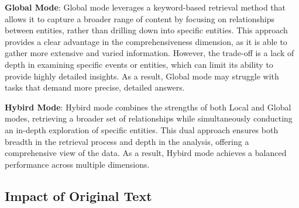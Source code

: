 \textbf{Global Mode}: Global mode leverages a keyword-based retrieval method that allows it to capture a broader range of content by focusing on relationships between entities, rather than drilling down into specific entities. This approach provides a clear advantage in the comprehensiveness dimension, as it is able to gather more extensive and varied information. However, the trade-off is a lack of depth in examining specific events or entities, which can limit its ability to provide highly detailed insights. As a result, Global mode may struggle with tasks that demand more precise, detailed answers.

\textbf{Hybird Mode}: Hybird mode combines the strengths of both Local and Global modes, retrieving a broader set of relationships while simultaneously conducting an in-depth exploration of specific entities. This dual approach ensures both breadth in the retrieval process and depth in the analysis, offering a comprehensive view of the data. As a result, Hybird mode achieves a balanced performance across multiple dimensions.

\subsection{Impact of Original Text}
